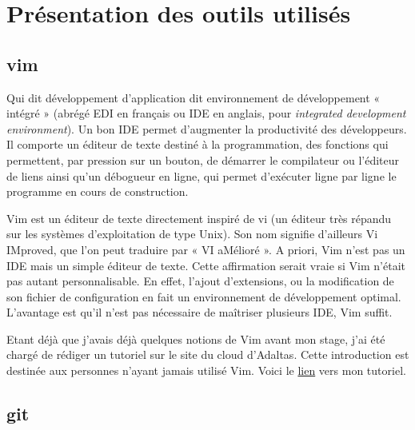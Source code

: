 \documentclass[12pt, french]{report}
\begin{document}
\section{Présentation des outils utilisés}

\subsection{vim}

Qui dit développement d'application dit environnement de développement « intégré » (abrégé EDI en français ou IDE en anglais, pour \textit{integrated development environment}). Un bon IDE permet d'augmenter la productivité des développeurs. Il comporte un éditeur de texte destiné à la programmation, des fonctions qui permettent, par pression sur un bouton, de démarrer le compilateur ou l'éditeur de liens ainsi qu'un débogueur en ligne, qui permet d'exécuter ligne par ligne le programme en cours de construction.

Vim est un éditeur de texte directement inspiré de vi (un éditeur très répandu sur les systèmes d’exploitation de type Unix). Son nom signifie d’ailleurs Vi IMproved, que l’on peut traduire par « VI aMélioré ». A priori, Vim n'est pas un IDE mais un simple éditeur de texte. Cette affirmation serait vraie si Vim n'était pas autant personnalisable. En effet, l'ajout  d'extensions, ou la modification de son fichier de configuration en fait un environnement de développement optimal. L'avantage est qu'il n'est pas nécessaire de maîtriser plusieurs IDE, Vim suffit.

Etant déjà que j'avais déjà quelques notions de Vim avant mon stage, j'ai été chargé de rédiger un tutoriel sur le site du cloud d'Adaltas. Cette introduction est destinée aux personnes n'ayant jamais utilisé Vim. Voici le \href{https://www.adaltas.cloud/en/docs/foundations/vim/}{lien} vers mon tutoriel.

\subsection{git}
\end{document}
